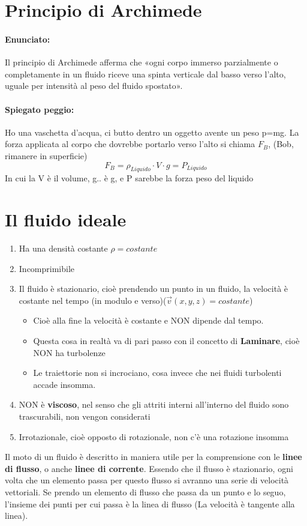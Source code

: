 \documentclass[12pt, a4paper, openany, oneside]{book}
\begin{document}
\section{Principio di Archimede}
\paragraph{Enunciato: }Il principio di Archimede afferma che «ogni corpo immerso 
parzialmente o completamente in un fluido riceve una spinta verticale dal basso
verso l'alto, uguale per intensità al peso del fluido spostato».
\paragraph{Spiegato peggio: }
Ho una vaschetta d'acqua, ci butto dentro un oggetto avente un peso p=mg. La 
forza applicata al corpo che dovrebbe portarlo verso l'alto si chiama $F_{B}$,
(Bob, rimanere in superficie)
\[
F_{B} = \rho _{Liquido} \cdot V \cdot g = P_{Liquido}
\]
In cui la V è il volume, g.. è g, e P sarebbe la forza peso del liquido
\section{Il fluido ideale }
\begin{enumerate}
	\item Ha una densità costante $\rho = costante$
	\item Incomprimibile
	\item Il fluido è stazionario, cioè prendendo un punto in un fluido, la 
	velocità è costante nel tempo (in modulo e verso)($\overrightarrow{v}(x,y,z)
	= costante$)
	\begin{itemize}
		\item Cioè alla fine la velocità è costante e NON dipende dal tempo. 
		\item Questa cosa in realtà va di pari passo con il concetto di 
		\textbf{Laminare}, cioè NON ha turbolenze 
		\item Le traiettorie non si incrociano, cosa invece che nei fluidi 
		turbolenti accade insomma.
	\end{itemize}
	\item NON è \textbf{viscoso}, nel senso che gli attriti interni all'interno
	del fluido sono trascurabili, non vengon considerati
	\item Irrotazionale, cioè opposto di rotazionale, non c'è una rotazione 
	insomma
\end{enumerate}
Il moto di un fluido è descritto in maniera utile per la comprensione con le 
\textbf{linee di flusso}, o anche \textbf{linee di corrente}. 
Essendo che il flusso è stazionario, ogni volta che un elemento passa per questo
flusso si avranno una serie di velocità vettoriali. Se prendo un elemento di 
flusso che passa da un punto e lo seguo, l'insieme dei punti per cui passa è la
linea di flusso (La velocità è tangente alla linea). 
\end{document}
